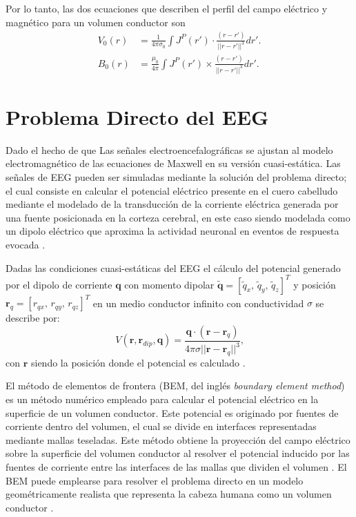 Por lo tanto, las dos ecuaciones que describen el perfil del campo eléctrico y magnético para un volumen conductor son
\begin{align}
	V_0(r) & = \frac{1}{4\pi\sigma_0} \int J^{P}(r') \cdot \frac{(r - r')}{||r - r'||^3} dr' \text{.} \label{eq:forward1} \\
	B_0(r) & = \frac{\mu_{0}}{4\pi} \int J^{P}(r') \times \frac{(r - r')}{||r - r'||^3} dr' \text{.} \label{eq:forward2}
\end{align}

\section{Problema Directo del EEG}
\label{sec:methodology:direct}

Dado el hecho de que Las señales electroencefalográficas se ajustan al modelo electromagnético de las ecuaciones de Maxwell en su versión cuasi-estática. 
Las señales de EEG pueden ser simuladas mediante la solución del problema directo; el cual consiste en calcular el potencial eléctrico presente en el cuero cabelludo mediante el modelado de la transducción de la corriente eléctrica generada por una fuente posicionada en la corteza cerebral, en este caso siendo modelada como un dipolo eléctrico que aproxima la actividad neuronal en eventos de respuesta evocada \cite{Mosher1999, Hallez2007}.

Dadas las condiciones cuasi-estáticas del EEG \cite{Plonsey1967} el cálculo del potencial generado por el dipolo de corriente $\mathbf{q}$ con momento dipolar  $\mathbf{\tilde{q}} = [\tilde{q}_x,\,\tilde{q}_y,\,\tilde{q}_z]^T$ y posición $\mathbf{r}_{q} = [r_{qx},\,r_{qy},\,r_{qz}]^T$ en un medio conductor infinito con conductividad $\sigma$ se describe por: \begin{equation}
	\label{fdip}
	V(\mathbf{r},\mathbf{r}_{dip},\mathbf{q})=\frac{\mathbf{q}\cdot(\mathbf{r}-\mathbf{r}_{q})}{4\pi \sigma {||\mathbf{r}-\mathbf{r}_{q}||}^{3}}\text{,}
\end{equation}
con $\mathbf{r}$ siendo la posición donde el potencial es calculado \cite{Hallez2007}.

El método de elementos de frontera (BEM, del inglés \emph{boundary element method}) es un método numérico empleado para calcular el potencial eléctrico en la superficie de un volumen conductor. Este potencial es originado por fuentes de corriente dentro del volumen, el cual se divide en interfaces representadas mediante mallas teseladas. 
Este método obtiene la proyección del campo eléctrico sobre la superficie del volumen conductor al resolver el potencial inducido por las fuentes de corriente entre las interfaces de las mallas que dividen el volumen \cite{Hallez2007}. 
El BEM puede emplearse para resolver el problema directo en un modelo geométricamente realista que representa la cabeza humana como un volumen conductor \cite{Ermer2001}.

